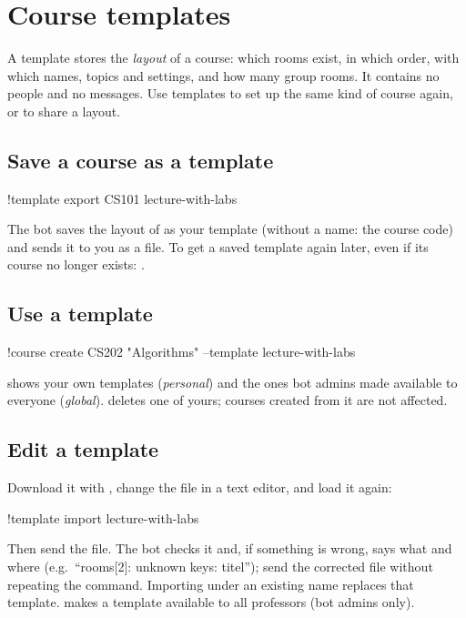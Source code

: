 \chapter{Course templates}
\label{ch:templates}

A template stores the \emph{layout} of a course: which rooms exist, in which order, with
which names, topics and settings, and how many group rooms. It contains no people and no
messages. Use templates to set up the same kind of course again, or to share a layout.

\section{Save a course as a template}

\begin{you}
!template export CS101 lecture-with-labs
\end{you}

The bot saves the layout of  as your template  (without a
name: the course code) and sends it to you as a  file. To get a saved template
again later, even if its course no longer exists:
.

\section{Use a template}

\begin{you}
!course create CS202 "Algorithms" --template lecture-with-labs
\end{you}

 shows your own templates (\emph{personal}) and the ones bot admins made
available to everyone (\emph{global}).  deletes one of yours;
courses created from it are not affected.

\section{Edit a template}

Download it with , change the file in a text editor, and load it again:

\begin{you}
!template import lecture-with-labs
\end{you}

Then send the  file. The bot checks it and, if something is wrong, says what and
where (e.g.\ \enquote{rooms[2]: unknown keys: titel}); send the corrected file without
repeating the command. Importing under an existing name replaces that template.
 makes a template available to all professors (bot admins only).

